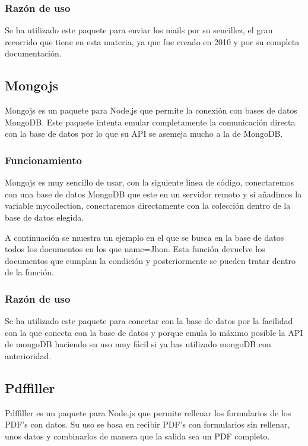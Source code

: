 
\subsubsection{Razón de uso}
Se ha utilizado este paquete para enviar los mails por su sencillez, el gran recorrido que tiene en esta materia, ya que fue creado en 2010 y por su completa documentación.

\subsection{Mongojs}
Mongojs\cite{mongojs} es un paquete para Node.js que permite la conexión con bases de datos MongoDB. Este paquete intenta emular completamente la comunicación directa con la base de datos por lo que su API se asemeja mucho a la de MongoDB.

\subsubsection{Funcionamiento}
Mongojs es muy sencillo de usar, con la siguiente linea de código, conectaremos con una base de datos MongoDB que este en un servidor remoto y si añadimos la variable mycollection, conectaremos directamente con la colección dentro de la base de datos elegida. \\


A continuación se muestra un ejemplo en el que se busca en la base de datos todos los documentos en los que name=Jhon. Esta función devuelve los documentos que cumplan la condición y posteriormente se pueden tratar dentro de la función.\\


\subsubsection{Razón de uso}
Se ha utilizado este paquete para conectar con la base de datos por la facilidad con la que conecta con la base de datos y porque emula lo máximo posible la API de mongoDB haciendo su uso muy fácil si ya has utilizado mongoDB con anterioridad.

\subsection{Pdffiller}
Pdffiller\cite{pdffiller} es un paquete para Node.js que permite rellenar los formularios de los PDF’s con datos. Su uso se basa en recibir PDF’s con formularios sin rellenar, unos datos y combinarlos de manera que la salida sea un PDF completo. 

